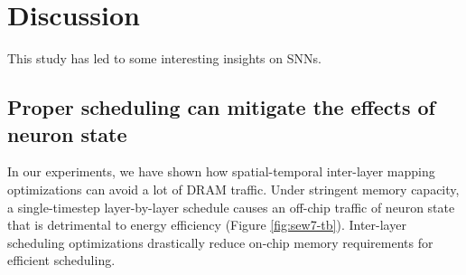 \section{Discussion} \label{sec:discussion}

This study has led to some interesting insights on SNNs.


\subsection*{Proper scheduling can mitigate the effects of neuron state}

In our experiments, we have shown how spatial-temporal inter-layer mapping optimizations can avoid a lot of DRAM traffic. Under stringent memory capacity, a single-timestep layer-by-layer schedule causes an off-chip traffic of neuron state that is detrimental to energy efficiency (Figure \ref{fig:sew7-tb}). Inter-layer scheduling optimizations drastically reduce on-chip memory requirements for efficient scheduling. 





